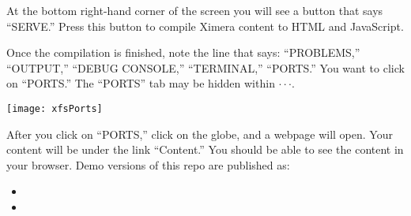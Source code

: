 \documentclass{ximera}
\begin{document}
At the bottom right-hand corner of the screen you will see a button that says
``SERVE.'' Press this button to compile Ximera content to HTML and JavaScript. 

\newpage
 Once the compilation is finished, note the line that says:
``PROBLEMS,'' ``OUTPUT,'' ``DEBUG CONSOLE,'' ``TERMINAL,'' ``PORTS.'' You want to click on ``PORTS.'' The ``PORTS'' tab may be hidden within $\cdot \cdot \cdot$.  
\begin{image}
    \texttt{[image: xfsPorts]}
\end{image}
After you click on ``PORTS,'' click on the globe, and a webpage will open. Your content will be under the link ``Content.'' You should be able to see the content in your browser. 
Demo versions of this repo are published as:
\begin{itemize}
\item {}
\item {}
\end{itemize}
\pdfOnly{\twocolumn}
\end{document}
